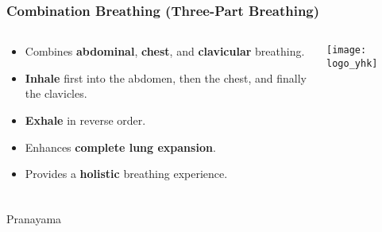 \begin{frame}[fragile]\frametitle{Combination Breathing (Three-Part Breathing)}
\begin{columns}
    \begin{column}[T]{0.5\linewidth}
      \begin{itemize}
        \item Combines \textbf{abdominal}, \textbf{chest}, and \textbf{clavicular} breathing.
        \item \textbf{Inhale} first into the abdomen, then the chest, and finally the clavicles.
        \item \textbf{Exhale} in reverse order.
        \item Enhances \textbf{complete lung expansion}.
        \item Provides a \textbf{holistic} breathing experience.
      \end{itemize}
    \end{column}
    \begin{column}[T]{0.5\linewidth}
        \begin{center}
        \texttt{[image: logo\_yhk]}
        \end{center}	
    \end{column}
\end{columns}
\end{frame}


\begin{frame}[fragile]\frametitle{}
\begin{center}
{\Large Pranayama}
\end{center}
\end{frame}

